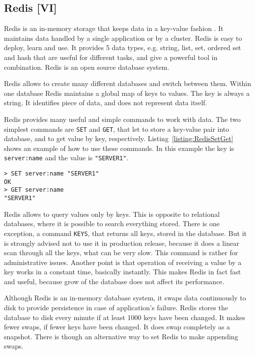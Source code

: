 \subsection{Redis [VI]}
\label{subs:redis}

Redis is an in-memory storage that keeps data in a key-value fashion \cite{Seguin2012, Redis}.
It maintains data handled by a single application or by a cluster.
Redis is easy to deploy, learn and use.
It provides 5 data types, e.g. string, list, set, ordered set and hash that are useful for different tasks, and give a powerful tool in combination.
Redis is an open source database system.


Redis allows to create many different databases and switch between them.
Within one database Redis maintains a global map of keys to values.
The key is always a string.
It identifies piece of data, and does not represent data itself.

Redis provides many useful and simple commands to work with data.
The two simplest commands are \lstinline{SET} and \lstinline{GET}, that let to store a key-value pair into database, and to get value by key, respectively.
Listing~\ref{listing:RedisSetGet} shows an example of how to use these commands.
In this example the key is \lstinline{server:name} and the value is \lstinline{"SERVER1"}.

\begin{lstlisting}[float=h, caption=Example of usage of commands SET and GET., label=listing:RedisSetGet]
> SET server:name "SERVER1"
OK
> GET server:name
"SERVER1"
\end{lstlisting}

Redis allows to query values only by keys.
This is opposite to relational databases, where it is possible to search everything stored.
There is one exception, a command \lstinline{KEYS}, that returns all keys, stored in the database.
But it is strongly advised not to use it in production release, because it does a linear scan through all the keys, what can be very slow.
This command is rather for administrative issues.
Another point is that operation of receiving a value by a key works in a constant time, basically instantly.
This makes Redis in fact fast and useful, because grow of the database does not affect its performance.

Although Redis is an in-memory database system, it swaps data continuously to disk to provide persistence in case of application's failure.
Redis stores the database to disk every minute if at least 1000 keys have been changed.
It makes fewer swaps, if fewer keys have been changed.
It does swap completely as a snapshot.
There is though an alternative way to set Redis to make appending swaps.

